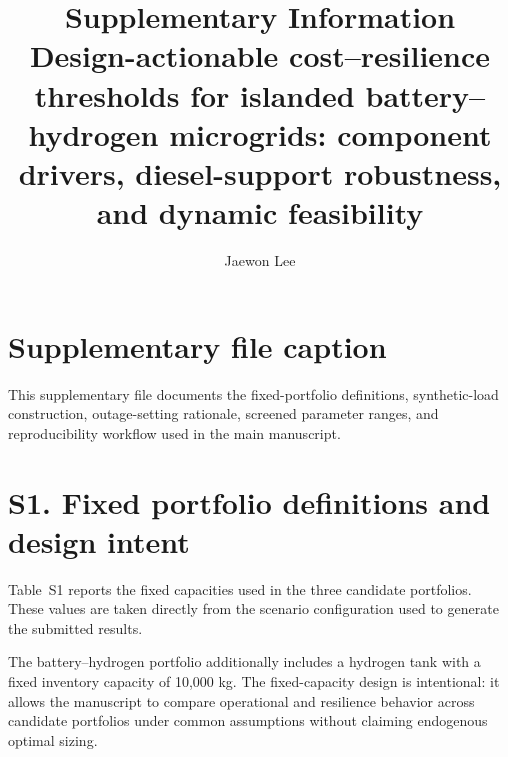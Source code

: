 \documentclass[11pt]{article}
\title{Supplementary Information\\Design-actionable cost--resilience thresholds for islanded battery--hydrogen microgrids: component drivers, diesel-support robustness, and dynamic feasibility}
\author{Jaewon Lee}
\date{}
\begin{document}
\maketitle

\section*{Supplementary file caption}
This supplementary file documents the fixed-portfolio definitions, synthetic-load construction, outage-setting rationale, screened parameter ranges, and reproducibility workflow used in the main manuscript.

\section*{S1. Fixed portfolio definitions and design intent}
Table~S1 reports the fixed capacities used in the three candidate portfolios. These values are taken directly from the scenario configuration used to generate the submitted results.

\begin{table}[H]
\centering
\caption{Fixed capacities used in the candidate portfolios.}
\label{tab:s1capacities}
\end{table}

The battery--hydrogen portfolio additionally includes a hydrogen tank with a fixed inventory capacity of 10{,}000 kg. The fixed-capacity design is intentional: it allows the manuscript to compare operational and resilience behavior across candidate portfolios under common assumptions without claiming endogenous optimal sizing.
\end{document}
